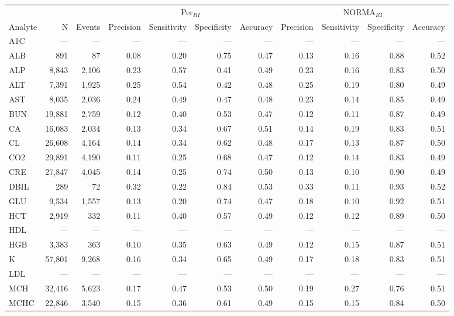 \begin{table}[ht]
\centering
\footnotesize
\begin{tabular}{lrrrrrrrrrr}
\toprule
 & &  & \multicolumn{4}{c}{Per$_{RI}$} & \multicolumn{4}{c}{NORMA$_{RI}$} \\
\cmidrule(lr){4-7} \cmidrule(lr){8-11}
Analyte & N & Events & Precision & Sensitivity & Specificity & Accuracy & Precision & Sensitivity & Specificity & Accuracy \\
\midrule
A1C & --- & --- & --- & --- & --- & --- & --- & --- & --- & --- \\
ALB & 891 & 87 & 0.08 & 0.20 & 0.75 & 0.47 & 0.13 & 0.16 & 0.88 & 0.52 \\
ALP & 8,843 & 2,106 & 0.23 & 0.57 & 0.41 & 0.49 & 0.23 & 0.16 & 0.83 & 0.50 \\
ALT & 7,391 & 1,925 & 0.25 & 0.54 & 0.42 & 0.48 & 0.25 & 0.19 & 0.80 & 0.49 \\
AST & 8,035 & 2,036 & 0.24 & 0.49 & 0.47 & 0.48 & 0.23 & 0.14 & 0.85 & 0.49 \\
BUN & 19,881 & 2,759 & 0.12 & 0.40 & 0.53 & 0.47 & 0.12 & 0.11 & 0.87 & 0.49 \\
CA & 16,083 & 2,034 & 0.13 & 0.34 & 0.67 & 0.51 & 0.14 & 0.19 & 0.83 & 0.51 \\
CL & 26,608 & 4,164 & 0.14 & 0.34 & 0.62 & 0.48 & 0.17 & 0.13 & 0.87 & 0.50 \\
CO2 & 29,891 & 4,190 & 0.11 & 0.25 & 0.68 & 0.47 & 0.12 & 0.14 & 0.83 & 0.49 \\
CRE & 27,847 & 4,045 & 0.14 & 0.25 & 0.74 & 0.50 & 0.13 & 0.10 & 0.90 & 0.49 \\
DBIL & 289 & 72 & 0.32 & 0.22 & 0.84 & 0.53 & 0.33 & 0.11 & 0.93 & 0.52 \\
GLU & 9,534 & 1,557 & 0.13 & 0.20 & 0.74 & 0.47 & 0.18 & 0.10 & 0.92 & 0.51 \\
HCT & 2,919 & 332 & 0.11 & 0.40 & 0.57 & 0.49 & 0.12 & 0.12 & 0.89 & 0.50 \\
HDL & --- & --- & --- & --- & --- & --- & --- & --- & --- & --- \\
HGB & 3,383 & 363 & 0.10 & 0.35 & 0.63 & 0.49 & 0.12 & 0.15 & 0.87 & 0.51 \\
K & 57,801 & 9,268 & 0.16 & 0.34 & 0.65 & 0.49 & 0.17 & 0.18 & 0.83 & 0.51 \\
LDL & --- & --- & --- & --- & --- & --- & --- & --- & --- & --- \\
MCH & 32,416 & 5,623 & 0.17 & 0.47 & 0.53 & 0.50 & 0.19 & 0.27 & 0.76 & 0.51 \\
MCHC & 22,846 & 3,540 & 0.15 & 0.36 & 0.61 & 0.49 & 0.15 & 0.15 & 0.84 & 0.50 \\

\end{tabular}
\end{table}

